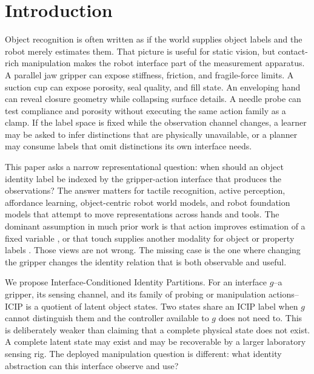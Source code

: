 \documentclass{article}
\newcommand{\icip}{\textsc{ICIP}}
\begin{document}
\section{Introduction}

Object recognition is often written as if the world supplies object labels and the robot merely estimates them.
That picture is useful for static vision, but contact-rich manipulation makes the robot interface part of the measurement apparatus.
A parallel jaw gripper can expose stiffness, friction, and fragile-force limits.
A suction cup can expose porosity, seal quality, and fill state.
An enveloping hand can reveal closure geometry while collapsing surface details.
A needle probe can test compliance and porosity without executing the same action family as a clamp.
If the label space is fixed while the observation channel changes, a learner may be asked to infer distinctions that are physically unavailable, or a planner may consume labels that omit distinctions its own interface needs.

This paper asks a narrow representational question: when should an object identity label be indexed by the gripper-action interface that produces the observations?
The answer matters for tactile recognition, active perception, affordance learning, object-centric robot world models, and robot foundation models that attempt to move representations across hands and tools.
The dominant assumption in much prior work is that action improves estimation of a fixed variable \citep{bajcsy1988active,bohg2017interactive,pajarinen2019active}, or that touch supplies another modality for object or property labels \citep{chitta2010tactile,calandra2018more,yuan2017gelsight,lee2019making}.
Those views are not wrong.
The missing case is the one where changing the gripper changes the identity relation that is both observable and useful.

We propose Interface-Conditioned Identity Partitions.
For an interface $g$--a gripper, its sensing channel, and its family of probing or manipulation actions--\icip{} is a quotient of latent object states.
Two states share an \icip{} label when $g$ cannot distinguish them and the controller available to $g$ does not need to.
This is deliberately weaker than claiming that a complete physical state does not exist.
A complete latent state may exist and may be recoverable by a larger laboratory sensing rig.
The deployed manipulation question is different: what identity abstraction can this interface observe and use?
\end{document}
